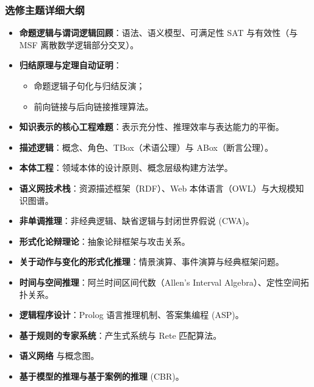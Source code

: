 \subsubsection{选修主题详细大纲}
\begin{itemize}
    \item \textbf{命题逻辑与谓词逻辑回顾}：语法、语义模型、可满足性 SAT 与有效性（与 MSF 离散数学逻辑部分交叉）。
    \item \textbf{归结原理与定理自动证明}：
    \begin{itemize}
        \item 命题逻辑子句化与归结反演；
        \item 前向链接与后向链接推理算法。
    \end{itemize}
    \item \textbf{知识表示的核心工程难题}：表示充分性、推理效率与表达能力的平衡。
    \item \textbf{描述逻辑}：概念、角色、TBox（术语公理）与 ABox（断言公理）。
    \item \textbf{本体工程}：领域本体的设计原则、概念层级构建方法学。
    \item \textbf{语义网技术栈}：资源描述框架（RDF）、Web 本体语言（OWL）与大规模知识图谱。
    \item \textbf{非单调推理}：非经典逻辑、缺省逻辑与封闭世界假说 (CWA)。
    \item \textbf{形式化论辩理论}：抽象论辩框架与攻击关系。
    \item \textbf{关于动作与变化的形式化推理}：情景演算、事件演算与经典框架问题。
    \item \textbf{时间与空间推理}：阿兰时间区间代数（Allen's Interval Algebra）、定性空间拓扑关系。
    \item \textbf{逻辑程序设计}：Prolog 语言推理机制、答案集编程 (ASP)。
    \item \textbf{基于规则的专家系统}：产生式系统与 Rete 匹配算法。
    \item \textbf{语义网络} 与概念图。
    \item \textbf{基于模型的推理与基于案例的推理} (CBR)。
\end{itemize}

